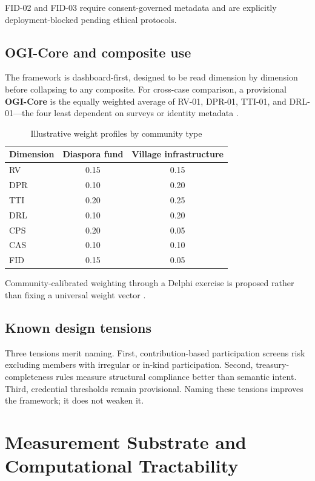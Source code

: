\documentclass[sigconf,anonymous]{acmart}
\begin{document}
FID-02 and FID-03 require consent-governed metadata and are explicitly deployment-blocked pending ethical protocols.

\subsection{OGI-Core and composite use}

The framework is dashboard-first, designed to be read dimension by dimension before collapsing to any composite. For cross-case comparison, a provisional \textbf{OGI-Core} is the equally weighted average of RV-01, DPR-01, TTI-01, and DRL-01---the four least dependent on surveys or identity metadata \cite{nardo2008,oman2006}.

\begin{table}[h]
\caption{Illustrative weight profiles by community type}
\label{tab:weights}
\small
\begin{tabular}{lcc}
\toprule
Dimension & Diaspora fund & Village infrastructure \\
\midrule
RV  & 0.15 & 0.15 \\
DPR & 0.10 & 0.20 \\
TTI & 0.20 & 0.25 \\
DRL & 0.10 & 0.20 \\
CPS & 0.20 & 0.05 \\
CAS & 0.10 & 0.10 \\
FID & 0.15 & 0.05 \\
\bottomrule
\end{tabular}
\end{table}

Community-calibrated weighting through a Delphi exercise is proposed rather than fixing a universal weight vector \cite{quyen2014}.

\subsection{Known design tensions}

Three tensions merit naming. First, contribution-based participation screens risk excluding members with irregular or in-kind participation. Second, treasury-completeness rules measure structural compliance better than semantic intent. Third, credential thresholds remain provisional. Naming these tensions improves the framework; it does not weaken it.

\section{Measurement Substrate and Computational Tractability}
\end{document}
